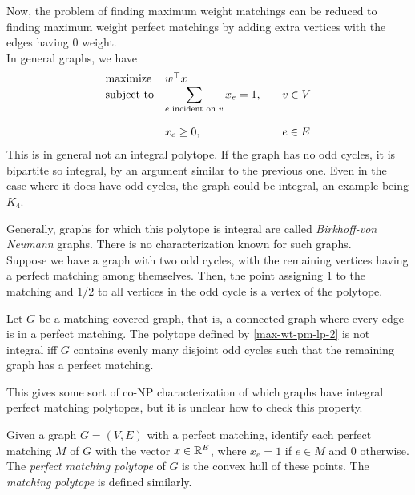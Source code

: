 	Now, the problem of finding maximum weight matchings can be reduced to finding maximum weight perfect matchings by adding extra vertices with the edges having $0$ weight.\\

	In general graphs, we have
	\[
	\label{max-wt-pm-lp-2}
	\begin{array}{ll@{}ll}
	\text{maximize}  & w^\top x &\\
	\text{subject to}& \displaystyle\sum\limits_{e \text{ incident on } v} x_{e} = 1,  &\qquad v \in V\\\\
	                 & x_{e} \ge 0,                                                &\qquad e \in E
	\end{array}
	\]
	This is in general not an integral polytope.
	If the graph has no odd cycles, it is bipartite so integral, by an argument similar to the previous one. Even in the case where it does have odd cycles, the graph could be integral, an example being $K_4$.

	Generally, graphs for which this polytope is integral are called \emph{Birkhoff-von Neumann} graphs. There is no characterization known for such graphs.\\
	Suppose we have a graph with two odd cycles, with the remaining vertices having a perfect matching among themselves. Then, the point assigning $1$ to the matching and $1/2$ to all vertices in the odd cycle is a vertex of the polytope.
	\begin{flem}
		\label{lem:matching-polytope-lem}
		Let $G$ be a matching-covered graph, that is, a connected graph where every edge is in a perfect matching. The polytope defined by \eqref{max-wt-pm-lp-2} is not integral iff $G$ contains evenly many disjoint odd cycles such that the remaining graph has a perfect matching.
	\end{flem}

	This gives some sort of co-\textsf{NP} characterization of which graphs have integral perfect matching polytopes, but it is unclear how to check this property.

	\begin{fdef}
		Given a graph $G = (V,E)$ with a perfect matching, identify each perfect matching $M$ of $G$ with the vector $x \in \mathbb{R}^E$, where $x_e = 1$ if $e \in M$ and $0$ otherwise. The \emph{perfect matching polytope} of $G$ is the convex hull of these points. The \emph{matching polytope} is defined similarly.
	\end{fdef}

